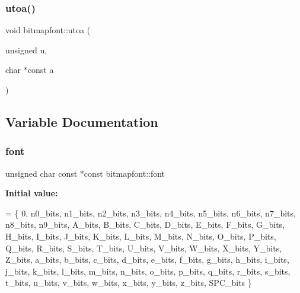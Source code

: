 \mbox{\label{namespacebitmapfont_ab29f48ccd8f7f70e8ff8ef37ed432195}} 
\subsubsection{\texorpdfstring{utoa()}{utoa()}}
{\footnotesize\ttfamily void bitmapfont\+::utoa (\begin{DoxyParamCaption}\item[{unsigned}]{u,  }\item[{char $\ast$const}]{a }\end{DoxyParamCaption})}



\subsection{Variable Documentation}
\mbox{\label{namespacebitmapfont_adb0f5b27148a985b29c91a4f21631b01}} 
\subsubsection{\texorpdfstring{font}{font}}
{\footnotesize\ttfamily unsigned char const  $\ast$const bitmapfont\+::font}

{\bfseries Initial value\+:}
\begin{DoxyCode}
= \{
    0,
    n0\_bits, n1\_bits, n2\_bits, n3\_bits, n4\_bits, n5\_bits, n6\_bits, n7\_bits, n8\_bits, n9\_bits,
    A\_bits, B\_bits, C\_bits, D\_bits, E\_bits, F\_bits, G\_bits, H\_bits, I\_bits, J\_bits, K\_bits, L\_bits, M\_bits,
    N\_bits, O\_bits, P\_bits, Q\_bits, R\_bits, S\_bits, T\_bits, U\_bits, V\_bits, W\_bits, X\_bits, Y\_bits, Z\_bits,
    a\_bits, b\_bits, c\_bits, d\_bits, e\_bits, f\_bits, g\_bits, h\_bits, i\_bits, j\_bits, k\_bits, l\_bits, m\_bits,
    n\_bits, o\_bits, p\_bits, q\_bits, r\_bits, s\_bits, t\_bits, u\_bits, v\_bits, w\_bits, x\_bits, y\_bits, z\_bits,
    SPC\_bits
\}
\end{DoxyCode}
